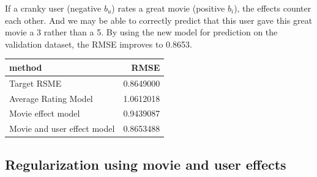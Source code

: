 \documentclass[]{article}
\newenvironment{Shaded}{\begin{snugshade}}{\end{snugshade}}
\newcommand{\CommentTok}[1]{\textcolor[rgb]{0.56,0.35,0.01}{\textit{#1}}}
\newcommand{\DataTypeTok}[1]{\textcolor[rgb]{0.13,0.29,0.53}{#1}}
\newcommand{\KeywordTok}[1]{\textcolor[rgb]{0.13,0.29,0.53}{\textbf{#1}}}
\newcommand{\NormalTok}[1]{#1}
\newcommand{\OperatorTok}[1]{\textcolor[rgb]{0.81,0.36,0.00}{\textbf{#1}}}
\newcommand{\StringTok}[1]{\textcolor[rgb]{0.31,0.60,0.02}{#1}}
\begin{document}
If a cranky user (negative \(b_{u}\)) rates a great movie (positive
\(b_{i}\)), the effects counter each other. And we may be able to
correctly predict that this user gave this great movie a 3 rather than a
5. By using the new model for prediction on the validation dataset, the
RMSE improves to 0.8653.

\begin{Shaded}
\end{Shaded}

\begin{longtable}[]{@{}lr@{}}
\toprule
method & RMSE\tabularnewline
\midrule
\endhead
Target RSME & 0.8649000\tabularnewline
Average Rating Model & 1.0612018\tabularnewline
Movie effect model & 0.9439087\tabularnewline
Movie and user effect model & 0.8653488\tabularnewline
\bottomrule
\end{longtable}

\subsection{Regularization using movie and user effects}
\label{sec:reg}
\end{document}
